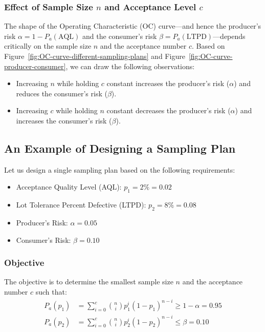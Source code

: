 \documentclass[twoside]{book}
\begin{document}
\subsubsection{Effect of Sample Size \(n\) and Acceptance Level \(c\)}

The shape of the Operating Characteristic (OC) curve—and hence the producer’s risk \(\alpha=1-P_a(\text{AQL})\) and the consumer’s risk \(\beta=P_a(\text{LTPD})\)—depends critically on the sample size \(n\) and the acceptance number \(c\). Based on Figure~\ref{fig:OC-curve-different-sampling-plans} and Figure~\ref{fig:OC-curve-producer-consumer}, we can draw the following observations:

\begin{itemize}
\item Increasing $n$ while holding $c$ constant increases the producer's risk ($\alpha$) and reduces the consumer's risk ($\beta$).
\item Increasing $c$ while holding $n$ constant decreases the producer's risk ($\alpha$) and increases the consumer’s risk ($\beta$).
\end{itemize}


\subsection{An Example of Designing a Sampling Plan}

Let us design a single sampling plan based on the following requirements:
\begin{itemize}
    \item Acceptance Quality Level (AQL): $p_1 = 2\% = 0.02$
    \item Lot Tolerance Percent Defective (LTPD): $p_2 = 8\% = 0.08$
    \item Producer's Risk: $\alpha = 0.05$
    \item Consumer's Risk: $\beta = 0.10$
\end{itemize}

\subsubsection{Objective}

The objective is to determine the smallest sample size $n$ and the acceptance number $c$ such that:
\begin{align*}
    P_a(p_1) &= \sum_{i=0}^c \binom{n}{i} p_1^i (1 - p_1)^{n - i} \ge 1 - \alpha = 0.95 \\
    P_a(p_2) &= \sum_{i=0}^c \binom{n}{i} p_2^i (1 - p_2)^{n - i} \le \beta = 0.10
\end{align*}
\end{document}
